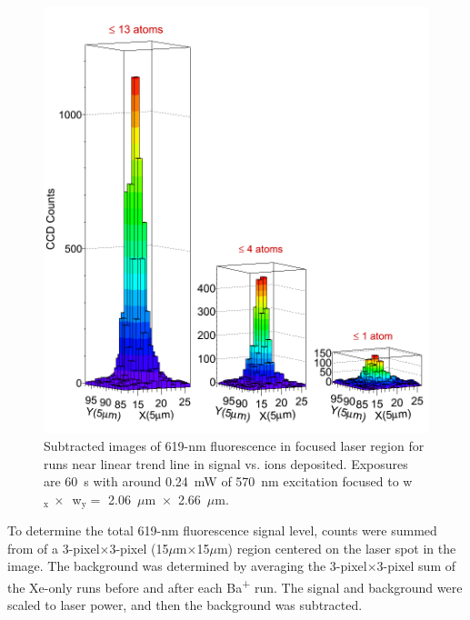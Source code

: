 \begin{figure} %
        \centering
                \includegraphics[width=.8\textwidth]{figures/train.png}
                \caption{Subtracted images of 619-nm fluorescence in focused laser region for runs near linear trend line in signal vs. ions deposited.  Exposures are 60~s with around 0.24~mW of 570~nm excitation focused to w$_{\text{x}}~\times$~w$_{\text{y}} =$ 2.06~$\mu$m~$\times$~2.66~$\mu$m.}
\label{fig:train}
\end{figure}

To determine the total 619-nm fluorescence signal level, counts were summed from of a 3-pixel$\times$3-pixel (15$\mu$m$\times$15$\mu$m) region centered on the laser spot in the image.  The background was determined by averaging the 3-pixel$\times$3-pixel sum of the Xe-only runs before and after each Ba\textsuperscript{+} run.  The signal and background were scaled to laser power, and then the background was subtracted.

